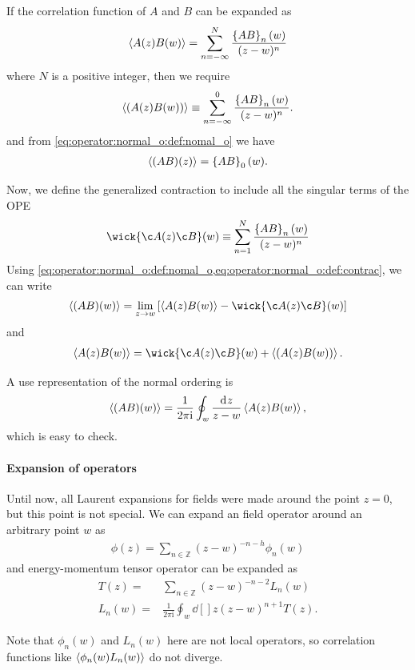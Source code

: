\documentclass[10pt]{article}
\newcommand{\ii}{\mathrm{i}}
\begin{document}
If the correlation function of $A$ and $B$ can be expanded as
\begin{align}
    \expval{A(z)B(w)}=\sum_{n=-\infty}^{N}\frac{\left\{AB\right\}_n(w)}{(z-w)^n}\label{eq:operator:normal_o:ABOPE}
\end{align}
where $N$ is a positive integer, then we require
\begin{align}
    \expval{(A(z)B(w))}\equiv\sum_{n=-\infty}^{0}\frac{\left\{AB\right\}_n(w)}{(z-w)^n}.\label{eq:operator:normal_o:def:nomal_o}
\end{align}
and from \cref{eq:operator:normal_o:def:nomal_o} we have
\begin{align}
    \expval{(AB)(z)}=\left\{AB\right\}_0(w).
\end{align}

Now, we define the generalized contraction to include all the singular terms of the OPE
\begin{align}
    \wick{\c A(z) \c B}(w)\equiv\sum_{n=1}^N\frac{\left\{AB\right\}_n(w)}{(z-w)^n}\label{eq:operator:normal_o:def:contrac}
\end{align}
Using \cref{eq:operator:normal_o:def:nomal_o,eq:operator:normal_o:def:contrac}, we can write
\begin{align}
    \expval{(AB)(w)}=\lim_{z\to w}\left[\expval{A(z)B(w)}-\wick{\c A(z) \c B}(w)\right]
\end{align}
and
\begin{align}
    \expval{A(z)B(w)}=\wick{\c A(z) \c B}(w)+\expval{\left(A(z)B(w)\right)}.
\end{align}
\begin{claim}
    A use representation of the normal ordering is
    \begin{align}
        \expval{(AB)(w)}=\frac{1}{2\pi\ii}\oint_w\frac{\dd[]{z}}{z-w}\expval{A(z)B(w)},\label{eq:operator:normal_o:alternative_norm_O}
    \end{align}
    which is easy to check.
\end{claim}
\paragraph{Expansion of operators}
Until now, all Laurent expansions for fields were made around the point $z=0$, but this point is not special.
We can expand an field operator around an arbitrary point $w$ as
\begin{align}
    \phi(z)=\sum_{n\in\mathbb{Z}}(z-w)^{-n-h}\phi_n(w)
\end{align}
and energy-momentum tensor operator can be expanded as
\begin{subequations}
    \begin{align}
        T(z)=   & \sum_{n\in\mathbb{Z}}(z-w)^{-n-2}L_n(w)          \\
        L_n(w)= & \frac{1}{2\pi\ii}\oint_w\dd[]{z}(z-w)^{n+1}T(z).
    \end{align}
\end{subequations}
\begin{remark}
    Note that $\phi_n(w)$ and $L_n(w)$ here are not local operators, so correlation functions like $\expval{\phi_n(w)L_n(w)}$ do not diverge.
\end{remark}
\end{document}
